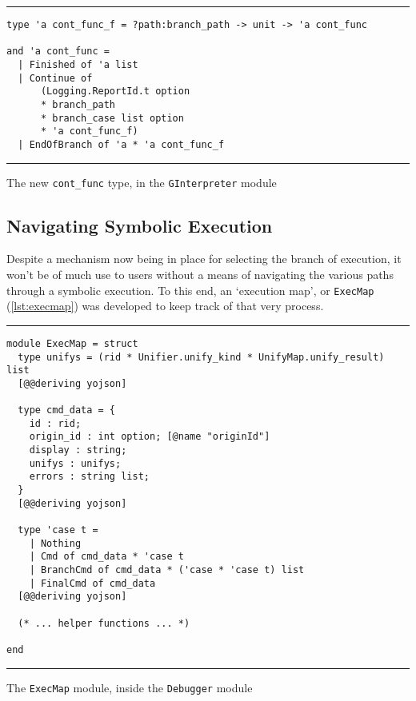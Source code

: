\begin{listing}[!ht]
\noindent\rule{\textwidth}{0.5pt}
\vspace{-0.6cm}
\begin{verbatim}
type 'a cont_func_f = ?path:branch_path -> unit -> 'a cont_func

and 'a cont_func =
  | Finished of 'a list
  | Continue of
      (Logging.ReportId.t option
      * branch_path
      * branch_case list option
      * 'a cont_func_f)
  | EndOfBranch of 'a * 'a cont_func_f
\end{verbatim}
\vspace{-0.4cm}
\noindent\rule{\textwidth}{0.5pt}
\vspace{-0.6cm}
\caption{The new \texttt{cont\_func} type, in the \texttt{GInterpreter} module}
\label{lst:contfunc-type-new}
\end{listing}


\subsection{Navigating Symbolic Execution}
\label{sec:navigating-symex}

Despite a mechanism now being in place for selecting the branch of execution, it
won't be of much use to users without a means of navigating the various paths
through a symbolic execution. To this end, an `execution map', or
\texttt{ExecMap} (\autoref{lst:execmap}) was developed to keep track of that
very process.

\begin{listing}[!ht]
\noindent\rule{\textwidth}{0.5pt}
\vspace{-0.6cm}
\begin{verbatim}
module ExecMap = struct
  type unifys = (rid * Unifier.unify_kind * UnifyMap.unify_result) list
  [@@deriving yojson]

  type cmd_data = {
    id : rid;
    origin_id : int option; [@name "originId"]
    display : string;
    unifys : unifys;
    errors : string list;
  }
  [@@deriving yojson]

  type 'case t =
    | Nothing
    | Cmd of cmd_data * 'case t
    | BranchCmd of cmd_data * ('case * 'case t) list
    | FinalCmd of cmd_data
  [@@deriving yojson]

  (* ... helper functions ... *)

end
\end{verbatim}
\vspace{-0.4cm}
\noindent\rule{\textwidth}{0.5pt}
\vspace{-0.6cm}
\caption{The \texttt{ExecMap} module, inside the \texttt{Debugger} module}
\label{lst:execmap}
\end{listing}

